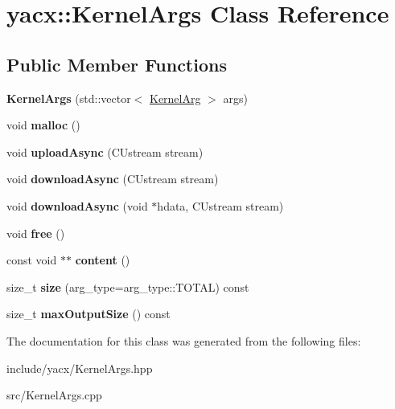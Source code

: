 \hypertarget{classyacx_1_1_kernel_args}{}\section{yacx\+:\+:Kernel\+Args Class Reference}
\label{classyacx_1_1_kernel_args}
\subsection*{Public Member Functions}
\begin{DoxyCompactItemize}
\item 
\mbox{\label{classyacx_1_1_kernel_args_a856a48b3aca3da86e811bc25bdd9b6e5}} 
{\bfseries Kernel\+Args} (std\+::vector$<$ \hyperlink{classyacx_1_1_kernel_arg}{Kernel\+Arg} $>$ args)
\item 
\mbox{\label{classyacx_1_1_kernel_args_a82b803d06c23a66348ee393d6b9ca5af}} 
void {\bfseries malloc} ()
\item 
\mbox{\label{classyacx_1_1_kernel_args_ada0a5d61939cab45bee8fe1e58dbef98}} 
void {\bfseries upload\+Async} (C\+Ustream stream)
\item 
\mbox{\label{classyacx_1_1_kernel_args_a7b94f1458c8dab73e0bfe16b62d713fe}} 
void {\bfseries download\+Async} (C\+Ustream stream)
\item 
\mbox{\label{classyacx_1_1_kernel_args_a8dccbadb58686321512b2bd3c3522ff6}} 
void {\bfseries download\+Async} (void $\ast$hdata, C\+Ustream stream)
\item 
\mbox{\label{classyacx_1_1_kernel_args_a5580224556d8d76afe6c2cec07e177ee}} 
void {\bfseries free} ()
\item 
\mbox{\label{classyacx_1_1_kernel_args_a8ddd9bf188f56658770e01c26a4f0251}} 
const void $\ast$$\ast$ {\bfseries content} ()
\item 
\mbox{\label{classyacx_1_1_kernel_args_a757cb6668ff92b1b320999a1482a9068}} 
size\+\_\+t {\bfseries size} (arg\+\_\+type=arg\+\_\+type\+::\+T\+O\+T\+AL) const
\item 
\mbox{\label{classyacx_1_1_kernel_args_a4b912ace428307a447bcdd54ceb70e22}} 
size\+\_\+t {\bfseries max\+Output\+Size} () const
\end{DoxyCompactItemize}


The documentation for this class was generated from the following files\+:\begin{DoxyCompactItemize}
\item 
include/yacx/Kernel\+Args.\+hpp\item 
src/Kernel\+Args.\+cpp\end{DoxyCompactItemize}
